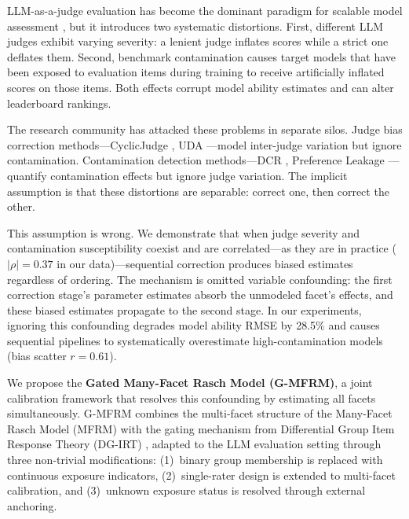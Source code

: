 \documentclass[11pt,a4paper]{article}
\begin{document}
LLM-as-a-judge evaluation has become the dominant paradigm for scalable model assessment \citep{zheng2023judging}, but it introduces two systematic distortions. First, different LLM judges exhibit varying severity: a lenient judge inflates scores while a strict one deflates them. Second, benchmark contamination causes target models that have been exposed to evaluation items during training to receive artificially inflated scores on those items. Both effects corrupt model ability estimates and can alter leaderboard rankings.

The research community has attacked these problems in separate silos. Judge bias correction methods---CyclicJudge \citep{lin2025cyclicjudge}, UDA \citep{li2024uda}---model inter-judge variation but ignore contamination. Contamination detection methods---DCR \citep{yang2024dcr}, Preference Leakage \citep{li2024preference}---quantify contamination effects but ignore judge variation. The implicit assumption is that these distortions are separable: correct one, then correct the other.

This assumption is wrong. We demonstrate that when judge severity and contamination susceptibility coexist and are correlated---as they are in practice ($|\rho| = 0.37$ in our data)---sequential correction produces biased estimates regardless of ordering. The mechanism is omitted variable confounding: the first correction stage's parameter estimates absorb the unmodeled facet's effects, and these biased estimates propagate to the second stage. In our experiments, ignoring this confounding degrades model ability RMSE by 28.5\% and causes sequential pipelines to systematically overestimate high-contamination models (bias scatter $r = 0.61$).

We propose the \textbf{Gated Many-Facet Rasch Model (G-MFRM)}, a joint calibration framework that resolves this confounding by estimating all facets simultaneously. G-MFRM combines the multi-facet structure of the Many-Facet Rasch Model (MFRM) \citep{linacre1989mfrm} with the gating mechanism from Differential Group Item Response Theory (DG-IRT) \citep{robitzsch2020dgirt}, adapted to the LLM evaluation setting through three non-trivial modifications: (1)~binary group membership is replaced with continuous exposure indicators, (2)~single-rater design is extended to multi-facet calibration, and (3)~unknown exposure status is resolved through external anchoring.
\end{document}
